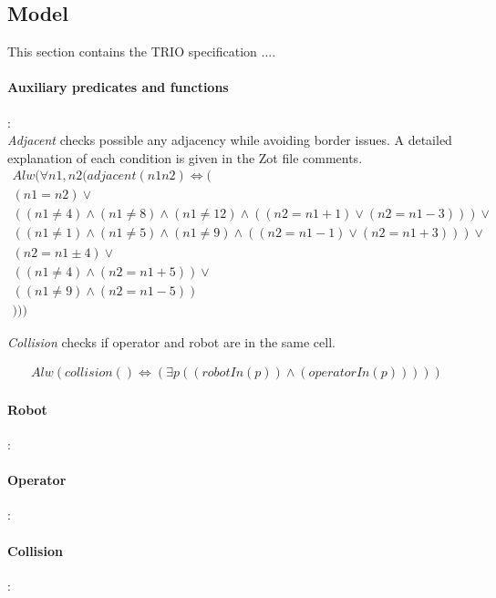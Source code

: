 \subsection{Model}
This section contains the TRIO specification ....

\paragraph{Auxiliary predicates and functions}:\\

\textit{Adjacent} checks possible any adjacency while avoiding border issues. A detailed explanation of each condition is given in the Zot file comments.
\begin{align*}
	Alw(\forall n1,n2 (adjacent(n1 n2)\iff (\\
	(n1 = n2) \lor \\
	((n1 \neq 4)\land(n1 \neq 8)\land(n1 \neq 12)\land((n2=n1+1)\lor(n2=n1-3)))\lor \\
	((n1 \neq 1)\land(n1 \neq 5)\land(n1 \neq 9)\land((n2=n1-1)\lor(n2=n1+3)))\lor \\
	(n2 = n1\pm 4) \lor \\
	((n1 \neq 4)\land(n2 = n1+ 5)) \lor \\
	((n1 \neq 9)\land(n2 = n1- 5))  \\
	)))
\end{align*}

\textit{Collision} checks if operator and robot are in the same cell.

\begin{align*}
	Alw(collision()\iff (\exists p(
	(robotIn(p)) \land 
	(operatorIn(p)) 
	)))
\end{align*}


\paragraph{Robot}:\\


\paragraph{Operator}:\\

\paragraph{Collision}:\\

